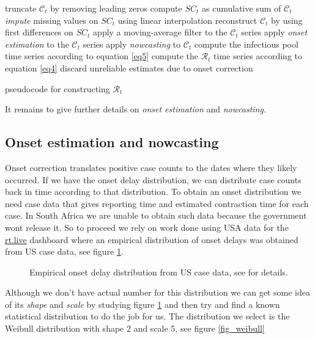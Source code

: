 \documentclass[11pt]{article}
\begin{document}
\begin{algorithm}[H]
 \Indp
truncate $\mathcal{C}_t$ by removing leading zeros\;
compute $SC_t$ as cumulative sum of $\mathcal{C}_t$\;
 {\it impute} missing values on $SC_t$ using linear interpolation\;
 reconstruct $\mathcal{C}_t$ by using first differences on $SC_t$\;
apply a moving-average filter to the $\mathcal{C}_t$ series\;
apply {\it onset estimation} to the $\mathcal{C}_t$ series\; 
apply {\it nowcasting} to $\mathcal{C}_t$\;
compute the infectious pool time series according to equation \ref{eq5}\;
compute the $\mathcal{R}_t$  time series according to equation \ref{eq4}\; 
discard unreliable estimates due to onset correction\;
\Indm
\label{alg1}
 \caption{pseudocode for constructing $\mathcal{R}_t$ }
\end{algorithm}

It remains to give further details on {\it onset estimation} and {\it nowcasting}.

\subsection{Onset estimation and nowcasting}

Onset correction translates positive case counts to the dates where they likely occurred. 
If we have the onset delay distribution, we can distribute case counts back in time 
according to that distribution. To obtain an onset distribution we need case data
that gives reporting time and estimated contraction time for each case.
In South Africa we are unable to obtain such data because the government wont
release it. So to proceed we rely on work done using USA data for the \url{rt.live} dashboard
where an empirical distribution of onset delays was obtained from US case data, 
see figure \ref{fig_empirical_onset_dist}.

\begin{figure}[H]
\begin{center}
\end{center}
\caption{Empirical onset delay distribution from US case data,  see \cite{systrom} for details.}  
\label{fig_empirical_onset_dist}
\end{figure}

Although we don't have actual number for this distribution we can get some idea of its {\it shape} and
{\it scale} by studying figure \ref{fig_empirical_onset_dist} and then try and find a known statistical
distribution to do the job for us. The distribution we select is the Weibull distribution with shape 2
and scale 5, see figure \ref{fig_weibull}
\end{document}
